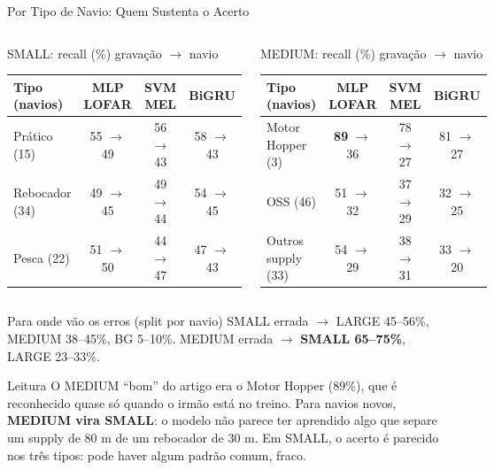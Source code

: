 \documentclass[aspectratio=169]{beamer}
\newcommand{\cahi}[1]{\cellcolor{green!30}\textbf{#1}}
\newcommand{\calo}[1]{\cellcolor{red!20}#1}
\begin{document}
\begin{frame}{Por Tipo de Navio: Quem Sustenta o Acerto}
    \footnotesize
    \begin{columns}[t]
        \begin{block}{\small SMALL: recall (\%) gravação $\to$ navio}
            \scriptsize
            \centering
            \setlength{\tabcolsep}{3pt}
            \begin{tabular}{lccc}
            \toprule
            Tipo (navios) & MLP LOFAR & SVM MEL & BiGRU \\
            \midrule
            Prático (15) & 55 $\to$ 49 & 56 $\to$ 43 & 58 $\to$ 43 \\
            Rebocador (34) & 49 $\to$ 45 & 49 $\to$ 44 & 54 $\to$ 45 \\
            Pesca (22) & 51 $\to$ 50 & 44 $\to$ 47 & 47 $\to$ 43 \\
            \bottomrule
            \end{tabular}
        \end{block}
        \begin{block}{\small MEDIUM: recall (\%) gravação $\to$ navio}
            \scriptsize
            \centering
            \setlength{\tabcolsep}{3pt}
            \begin{tabular}{lccc}
            \toprule
            Tipo (navios) & MLP LOFAR & SVM MEL & BiGRU \\
            \midrule
            Motor Hopper (3) & \cahi{89} $\to$ \calo{36} & 78 $\to$ \calo{27} & 81 $\to$ \calo{27} \\
            OSS (46) & 51 $\to$ 32 & 37 $\to$ 29 & 32 $\to$ 25 \\
            Outros supply (33) & 54 $\to$ 29 & 38 $\to$ 31 & 33 $\to$ 20 \\
            \bottomrule
            \end{tabular}
        \end{block}
    \end{columns}
    \vspace{0.1cm}
    \begin{block}{\small Para onde vão os erros (split por navio)}
        \scriptsize
        SMALL errada $\to$ LARGE 45--56\%, MEDIUM 38--45\%, BG 5--10\%. \quad MEDIUM errada $\to$ \textbf{SMALL 65--75\%}, LARGE 23--33\%.
    \end{block}
    \vspace{0.05cm}
    \begin{alertblock}{Leitura}
        \scriptsize
        O MEDIUM ``bom'' do artigo era o Motor Hopper (89\%), que é reconhecido quase só quando o irmão está no treino. Para navios novos, \textbf{MEDIUM vira SMALL}: o modelo não parece ter aprendido algo que separe um supply de 80 m de um rebocador de 30 m. Em SMALL, o acerto é parecido nos três tipos: pode haver algum padrão comum, fraco.
    \end{alertblock}
\end{frame}
\end{document}

